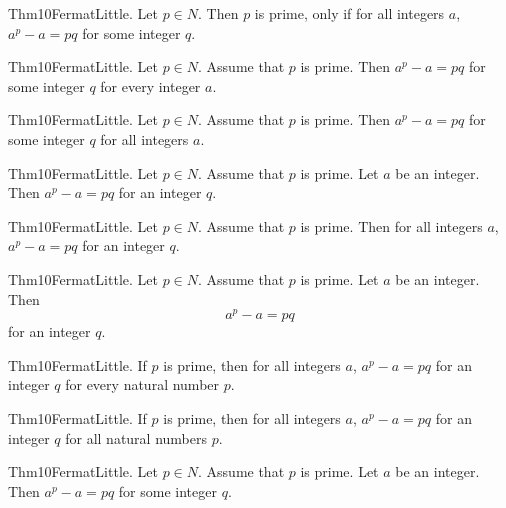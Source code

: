 \documentclass{article}
\begin{document}
Thm10FermatLittle. Let $p \in N$. Then $p$ is prime, only if for all integers $a$, $a ^ {p}- a = p q$ for some integer $q$.

Thm10FermatLittle. Let $p \in N$. Assume that $p$ is prime. Then $a ^ {p}- a = p q$ for some integer $q$ for every integer $a$.

Thm10FermatLittle. Let $p \in N$. Assume that $p$ is prime. Then $a ^ {p}- a = p q$ for some integer $q$ for all integers $a$.

Thm10FermatLittle. Let $p \in N$. Assume that $p$ is prime. Let $a$ be an integer. Then $a ^ {p}- a = p q$ for an integer $q$.

Thm10FermatLittle. Let $p \in N$. Assume that $p$ is prime. Then for all integers $a$, $a ^ {p}- a = p q$ for an integer $q$.

Thm10FermatLittle. Let $p \in N$. Assume that $p$ is prime. Let $a$ be an integer. Then $$a ^ {p}- a = p q$$ for an integer $q$.

Thm10FermatLittle. If $p$ is prime, then for all integers $a$, $a ^ {p}- a = p q$ for an integer $q$ for every natural number $p$.

Thm10FermatLittle. If $p$ is prime, then for all integers $a$, $a ^ {p}- a = p q$ for an integer $q$ for all natural numbers $p$.

Thm10FermatLittle. Let $p \in N$. Assume that $p$ is prime. Let $a$ be an integer. Then $a ^ {p}- a = p q$ for some integer $q$.
\end{document}
